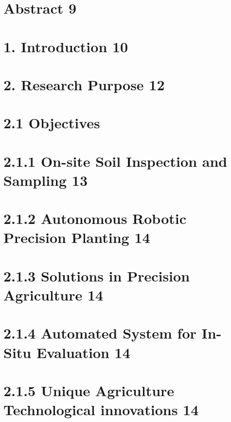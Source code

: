 \documentclass{book} %
\begin{document}
\noindent 
\chapter{Abstract                     9}

\noindent 
\chapter{1. Introduction                  10}

\noindent 
\chapter{2. Research Purpose                                                                                                                     12 }


\chapter{2.1 Objectives                                                                                                                     }


\chapter{2.1.1 On-site Soil Inspection and Sampling                                           13}


\chapter{2.1.2 Autonomous Robotic Precision Planting            14}


\chapter{2.1.3 Solutions in Precision Agriculture             14}


\chapter{2.1.4 Automated System for In-Situ Evaluation            14}


\chapter{2.1.5 Unique Agriculture Technological innovations            14}
\end{document}
